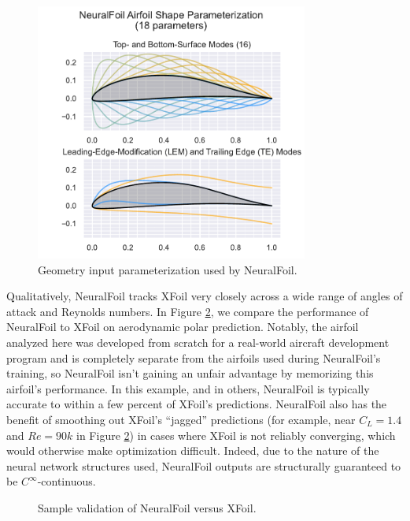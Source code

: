 \documentclass[12pt,vi,oneside,table]{report}
\begin{document}
    \begin{figure}[H]
        \centering
        \includegraphics[width=0.8\textwidth]{../figures/neuralfoil/kulfan_parameterization_illustration.pdf}
        \caption{Geometry input parameterization used by NeuralFoil.}
        \label{fig:neuralfoil_parameterization}
    \end{figure}

    Qualitatively, NeuralFoil tracks XFoil very closely across a wide range of angles of attack and Reynolds numbers. In Figure \ref{fig:clcd_polar}, we compare the performance of NeuralFoil to XFoil on aerodynamic polar prediction. Notably, the airfoil analyzed here was developed from scratch for a real-world aircraft development program and is completely separate from the airfoils used during NeuralFoil's training, so NeuralFoil isn't gaining an unfair advantage by memorizing this airfoil's performance. In this example, and in others, NeuralFoil is typically accurate to within a few percent of XFoil's predictions. NeuralFoil also has the benefit of smoothing out XFoil's ``jagged'' predictions (for example, near $C_L=1.4$ and $Re=90k$ in Figure \ref{fig:clcd_polar}) in cases where XFoil is not reliably converging, which would otherwise make optimization difficult. Indeed, due to the nature of the neural network structures used, NeuralFoil outputs are structurally guaranteed to be $C^\infty$-continuous.

    \begin{figure}[htbp!]
        \centering
        
        \caption{Sample validation of NeuralFoil versus XFoil.}
        \label{fig:clcd_polar}
    \end{figure}
\end{document}
